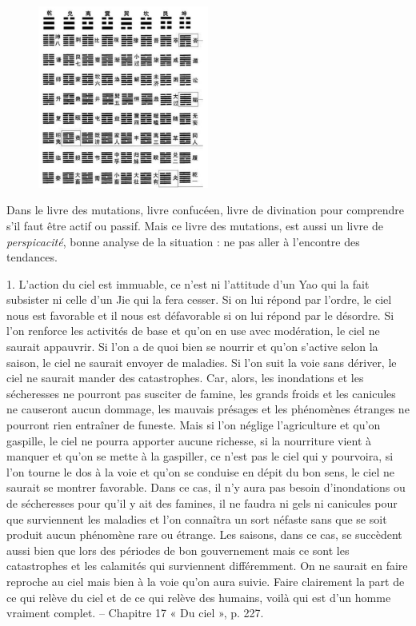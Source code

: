 \begin{figure}[!h]
    \centering
    \includegraphics[width=0.5\textwidth]{ConfucianismeTaoismeBouddhismeChinois/Images/YinYanghexagrammes.png}

    \label{fig:enter-label}
\end{figure}

Dans le livre des mutations, livre confucéen, livre de divination pour comprendre s'il faut être actif ou passif. Mais ce livre des mutations, est aussi un livre de \textit{perspicacité}, bonne analyse de la situation : ne pas aller à l'encontre des tendances. 
\begin{singlequote}
    1.	L’action du ciel est immuable, ce n’est ni l’attitude d’un Yao qui la fait subsister ni celle d’un Jie qui la fera cesser. Si on lui répond par l’ordre, le ciel nous est favorable et il nous est défavorable si on lui répond par le désordre. Si l’on renforce les activités de base et qu’on en use avec modération, le ciel ne saurait appauvrir. Si l’on a de quoi bien se nourrir et qu’on s’active selon la saison, le ciel ne saurait envoyer de maladies. Si l’on suit la voie sans dériver, le ciel ne saurait mander des catastrophes. Car, alors, les inondations et les sécheresses ne pourront pas susciter de famine, les grands froids et les canicules ne causeront aucun dommage, les mauvais présages et les phénomènes étranges ne pourront rien entraîner de funeste. Mais si l’on néglige l’agriculture et qu’on gaspille, le ciel ne pourra apporter aucune richesse, si la nourriture vient à manquer et qu’on se mette à la gaspiller, ce n’est pas le ciel qui y pourvoira, si l’on tourne le dos à la voie et qu’on se conduise en dépit du bon sens, le ciel ne saurait se montrer favorable. Dans ce cas, il n’y aura pas besoin d’inondations ou de sécheresses pour qu’il y ait des famines, il ne faudra ni gels ni canicules pour que surviennent les maladies et l’on connaîtra un sort néfaste sans que se soit produit aucun phénomène rare ou étrange. Les saisons, dans ce cas, se succèdent aussi bien que lors des périodes de bon gouvernement mais ce sont les catastrophes et les calamités qui surviennent différemment. On ne saurait en faire reproche au ciel mais bien à la voie qu’on aura suivie. Faire clairement la part de ce qui relève du ciel et de ce qui relève des humains, voilà qui est d’un homme vraiment complet.
-- Chapitre 17 « Du ciel », p. 227.
\end{singlequote}


